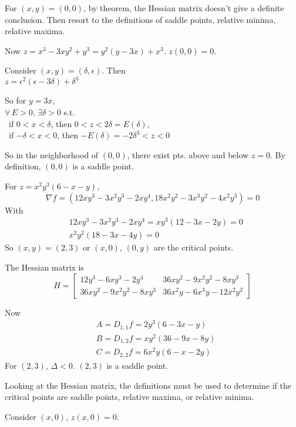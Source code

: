 \documentclass[twoside]{amsart}
\theoremstyle{plain}
\theoremstyle{definition}
\newcommand{\exercisehead}[1]
  {
   \noindent{\small\bf Exercise #1.}
   \smallskip}
\begin{document}
For $(x,y) = (0,0)$, by theorem, the Hessian matrix doesn't give a definite conclusion.  Then resort to the definitions of saddle points, relative minima, relative maxima.  

Now $z = x^3-  3xy^2 + y^3 = y^2(y-3x) + x^3$.  $z(0,0) = 0$.  

Consider $(x,y) = (\delta, \epsilon)$.  Then \\

$z = \epsilon^2(\epsilon -3 \delta) + \delta^3$

So for $y=3x$,  \\

$\forall \, E > 0 , \, \exists \delta >0$ s.t. \\
\quad \quad \, if $ 0 < x < \delta $, then $0<z < 2 \delta = E(\delta)$, \\
\quad \quad \, if $- \delta < x < 0$, then $-E(\delta) = -2\delta^3 < z < 0$

So in the neighborhood of $(0,0)$, there exist pts. above and below $z=0$.  By definition, $(0,0)$ is a saddle point.  

\exercisehead{8} For $z = x^2 y^3 (6-x-y)$,
\[
\nabla f = (12 xy^3 - 3x^2 y^3 - 2xy^4, 18 x^2 y^2 - 3x^3 y^2 - 4x^2 y^3) = 0 
\]
With
\[
\begin{aligned}
  & 12 xy^3 - 3x^2 y ^3 - 2xy^4 = xy^3(12-3x - 2y) = 0 \\
  & x^2 y ^2 ( 18 - 3x - 4y ) = 0 
\end{aligned}
\]
So $(x,y) = (2,3)$ or $(x,0)$, $(0,y)$ are the critical points.  

The Hessian matrix is 
\[
H = \left[ \begin{matrix} 12 y^3 - 6xy^3 - 2y^4 & 36 xy^2 - 9x^2 y^2 - 8xy^3 \\ 36 xy^2 - 9x^2 y^2 - 8xy^3 & 36 x^2  y - 6 x^3 y - 12 x^2 y^2 \end{matrix} \right]
\]

Now
\[
\begin{aligned}
  & A = D_{1,1}f = 2y^3 (6-3x - y) \\ 
  & B = D_{1,2}f = xy^2 (36 - 9x - 8y) \\ 
  & C = D_{2,2}f = 6x^2 y(6-x-2y)
\end{aligned}
\]
For $(2,3)$, $\Delta < 0$.  $(2,3)$ is a saddle point.  

Looking at the Hessian matrix, the definitions must be used to determine if the critical points are saddle points, relative maxima, or relative minima.  

Consider $(x,0)$, $z(x,0) = 0$.  
\end{document}
